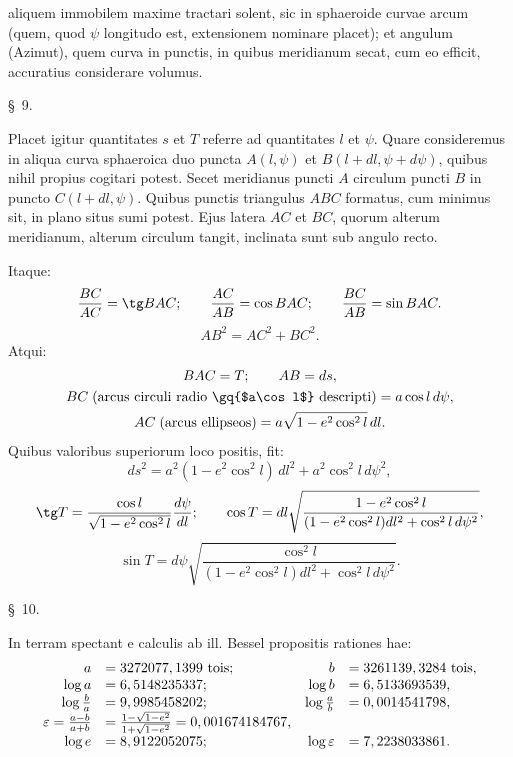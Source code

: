 aliquem immobilem maxime tractari solent, sic in sphaeroide curvae arcum  (quem, quod $\psi$ longitudo est, extensionem nominare placet); et angulum  (Azimut), quem curva in punctis, in quibus meridianum secat, cum eo efficit, accuratius considerare volumus.

\begin{center}\S\ 9.\end{center}
Placet igitur quantitates $s$ et $T$ referre ad quantitates $l$ et $\psi$. Quare consideremus in aliqua curva sphaeroica duo puncta $A(l,\psi)$ et $B(l+dl,\psi+d\psi)$, quibus nihil propius cogitari potest. Secet meridianus puncti $A$ circulum puncti $B$ in puncto $C(l+dl,\psi)$. Quibus punctis triangulus $ABC$ formatus, cum minimus sit, in plano situs sumi potest. Ejus latera $AC$ et $BC$, quorum alterum meridianum, alterum circulum tangit, inclinata sunt sub angulo recto.

Itaque:
\[
 {BC\over AC}=\tg BAC;\qquad {AC\over AB}=\cos BAC;\qquad {BC\over AB}=\sin BAC.
\]
\[
  AB^2=AC^2+BC^2.
\]
Atqui:
\[
\begin{gathered}
 BAC=T;\qquad AB=ds,\\
 BC\;\hbox{(arcus circuli radio \gq{$a\cos l$} descripti)}=a\cos l\,d\psi,\\
 AC\;\hbox{(arcus ellipseos)}=a\sqrt{1-e^2\cos^2 l}\,dl.
\end{gathered}
\]
Quibus valoribus superiorum loco positis, fit:
\[
 ds^2=a^2(1-e^2\cos^2l)\,dl^2+a^2\cos^2l\,d\psi^2,
\]
\[
\tg T={\cos l\over\sqrt{1-e^2\cos^2l}}{d\psi\over dl};\qquad
\cos T=dl\sqrt{\frac{1-e^2\cos^2l}{(1-e^2\cos^2l)dl^2+\cos^2l\,d\psi^2}},
\]
\[
\sin T=d\psi\sqrt{\frac{\cos^2l}{(1-e^2\cos^2l)dl^2+\cos^2l\,d\psi^2}}.
\]

\begin{center}\S\ 10.\end{center}
In terram spectant e calculis ab ill. Bessel propositis rationes hae:
\[
\begin{array}{rlrl}
 a&=3272077,1399\ \hbox{tois}; & b&=3261139,3284\ \hbox{tois},\\
 \log a&=6,5148235337; & \log b&=6,5133693539,\\
 \log {b\over a}&=9,9985458202; & \log {a\over b}&=0,0014541798,\\
 \varepsilon={a-b\over a+b}&={1-\sqrt{1-e^2}\over 1+\sqrt{1-e^2}}=0,001674184767,\\
 \log e&=8,9122052075; & \log\varepsilon&=7,2238033861.
\end{array}
\]
